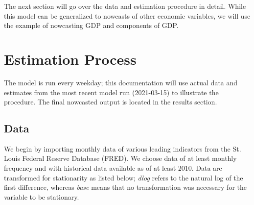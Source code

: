 \documentclass[11pt, letterpaper]{article}\usepackage[]{graphicx}\usepackage[]{color}
\begin{document}
The next section will go over the data and estimation procedure in detail. While this model can be generalized to nowcasts of other economic variables, we will use the example of nowcasting GDP and components of GDP.

\newpage
\section{Estimation Process}
The model is run every weekday; this documentation will use actual data and estimates from the most recent model run (2021-03-15) to illustrate the procedure. The final nowcasted output is located in the results section.

\subsection{Data}
We begin by importing monthly data of various leading indicators from the St. Louis Federal Reserve Database (FRED). We choose data of at least monthly frequency and with historical data available as of at least 2010. Data are transformed for stationarity as listed below; \textit{dlog} refers to the natural log of the first difference, whereas \textit{base} means that no transformation was necessary for the variable to be stationary.
\end{document}
